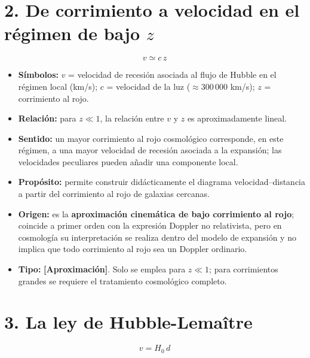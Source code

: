 \section*{2. De corrimiento a velocidad en el régimen de bajo $z$}

\[ v \simeq c\,z \]

\begin{itemize}
  \item \textbf{Símbolos:} $v$ = velocidad de recesión asociada al flujo de Hubble en el régimen local (km/s); $c$ = velocidad de la luz ($\approx 300\,000$ km/s); $z$ = corrimiento al rojo.
  \item \textbf{Relación:} para $z\ll1$, la relación entre $v$ y $z$ es aproximadamente lineal.
  \item \textbf{Sentido:} un mayor corrimiento al rojo cosmológico corresponde, en este régimen, a una mayor velocidad de recesión asociada a la expansión; las velocidades peculiares pueden añadir una componente local.
  \item \textbf{Propósito:} permite construir didácticamente el diagrama velocidad--distancia a partir del corrimiento al rojo de galaxias cercanas.
  \item \textbf{Origen:} es la \textbf{aproximación cinemática de bajo corrimiento al rojo}; coincide a primer orden con la expresión Doppler no relativista, pero en cosmología su interpretación se realiza dentro del modelo de expansión y no implica que todo corrimiento al rojo sea un Doppler ordinario.
  \item \textbf{Tipo:} \textbf{[Aproximación]}. Solo se emplea para $z\ll1$; para corrimientos grandes se requiere el tratamiento cosmológico completo.
\end{itemize}

\section*{3. La ley de Hubble-Lemaître}

\[ v = H_0\,d \]

